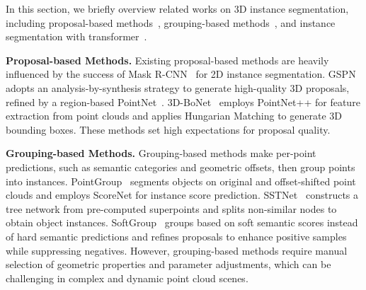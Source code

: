 In this section, we briefly overview related works on 3D instance segmentation, including proposal-based methods~\cite{yi2019gspn,hou20193d,yang2019learning}, grouping-based methods~\cite{engelmann20203d,liu2020learning,wang2018sgpn,wang2019associatively,lahoud20193d,jiang2020pointgroup,engelmann20203d,han2020occuseg,jiang2020pointgroup,jiang2020end,chen2021hierarchical,liang2021instance,vu2022softgroup}, and instance segmentation with transformer~\cite{cheng2021per, cheng2022masked,schult2022mask3d,sun2023superpoint,lu2023query,lai2023mask}.

{\bf Proposal-based Methods.}
%
Existing proposal-based methods are heavily influenced by the success of Mask R-CNN~\cite{he2017mask} for 2D instance segmentation. GSPN~\cite{yi2019gspn} adopts an analysis-by-synthesis strategy to generate high-quality 3D proposals, refined by a region-based PointNet~\cite{qi2017pointnet}. 3D-BoNet~\cite{yang2019learning} employs PointNet++\cite{qi2017pointnet++} for feature extraction from point clouds and applies Hungarian Matching\cite{kuhn1955hungarian} to generate 3D bounding boxes. These methods set high expectations for proposal quality.

{\bf Grouping-based Methods.}
%
Grouping-based methods make per-point predictions, such as semantic categories and geometric offsets, then group points into instances. 
PointGroup~\cite{jiang2020pointgroup} segments objects on original and offset-shifted point clouds and employs ScoreNet for instance score prediction. %
SSTNet~\cite{liang2021instance} constructs a tree network from pre-computed superpoints and splits non-similar nodes to obtain object instances. 
SoftGroup~\cite{vu2022softgroup} groups based on soft semantic scores instead of hard semantic predictions and refines proposals to enhance positive samples while suppressing negatives. However, grouping-based methods require manual selection of geometric properties and parameter adjustments, which can be challenging in complex and dynamic point cloud scenes.


